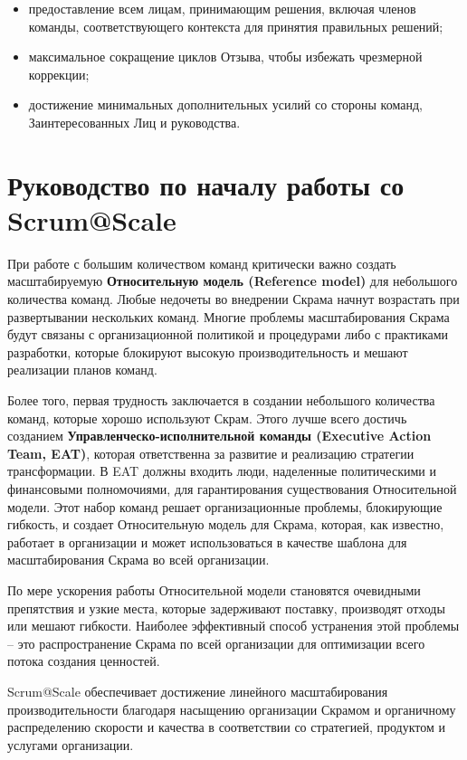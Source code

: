 \documentclass[12pt,a4paper,parskip=full]{scrartcl}
\begin{document}
\begin{itemize}
	\item предоставление всем лицам, принимающим решения, включая членов команды, соответствующего контекста для принятия правильных решений;
	\item максимальное сокращение циклов Отзыва, чтобы избежать чрезмерной коррекции;
	\item достижение минимальных дополнительных усилий со стороны команд, Заинтересованных Лиц и руководства.
\end{itemize}

\section{Руководство по началу работы со Scrum@Scale}

При работе с большим количеством команд критически важно создать масштабируемую  \textbf{Относительную модель (Reference model)} для небольшого количества команд. Любые недочеты во внедрении Скрама начнут возрастать при развертывании нескольких команд. Многие проблемы масштабирования Скрама будут связаны с организационной политикой и процедурами либо с практиками разработки, которые блокируют высокую производительность и мешают реализации планов команд. 

Более того, первая трудность заключается в создании небольшого количества команд, которые хорошо используют Скрам. Этого лучше всего достичь созданием \textbf{Управленческо-исполнительной команды (Executive Action Team, EAT)}, которая ответственна за развитие и реализацию стратегии трансформации. В EAT должны входить люди, наделенные политическими и финансовыми полномочиями, для гарантирования существования Относительной модели. Этот набор команд решает организационные проблемы, блокирующие гибкость, и создает Относительную модель для Скрама, которая, как известно, работает в организации и может использоваться в качестве шаблона для масштабирования Скрама во всей организации.

По мере ускорения работы Относительной модели становятся очевидными препятствия и узкие места, которые задерживают поставку, производят отходы или мешают гибкости. Наиболее эффективный способ устранения этой проблемы – это распространение Скрама по всей организации для оптимизации всего потока создания ценностей.

Scrum@Scale обеспечивает достижение линейного масштабирования производительности благодаря насыщению организации Скрамом и органичному распределению скорости и качества в соответствии со стратегией, продуктом и услугами организации.
\end{document}
